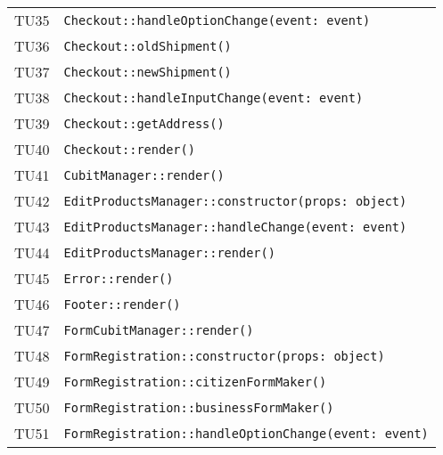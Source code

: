 \begin{longtable}{ >{\centering}p{} >{}p{}}
			\hypertarget{TU35}{TU35} & 
			\texttt{Checkout::handleOptionChange(event: event)}\\
			
			\hypertarget{TU36}{TU36} & 
			\texttt{Checkout::oldShipment()}\\
			
			\hypertarget{TU37}{TU37} & 
			\texttt{Checkout::newShipment()}\\
			
			\hypertarget{TU38}{TU38} & 
			\texttt{Checkout::handleInputChange(event: event)}\\
			
			\hypertarget{TU39}{TU39} & 
			\texttt{Checkout::getAddress()}\\
			
			\hypertarget{TU40}{TU40} & 
			\texttt{Checkout::render()}\\
			
			\hypertarget{TU41}{TU41} & 
			\texttt{CubitManager::render()}\\
			
			\hypertarget{TU42}{TU42} & 
			\texttt{EditProductsManager::constructor(props: object)}\\
			
			\hypertarget{TU43}{TU43} & 
			\texttt{EditProductsManager::handleChange(event: event)}\\
			
			\hypertarget{TU44}{TU44} & 
			\texttt{EditProductsManager::render()}\\
			
			\hypertarget{TU45}{TU45} & 
			\texttt{Error::render()}\\
			
			\hypertarget{TU46}{TU46} & 
			\texttt{Footer::render()}\\
			
			\hypertarget{TU47}{TU47} & 
			\texttt{FormCubitManager::render()}\\
			
			\hypertarget{TU48}{TU48} & 
			\texttt{FormRegistration::constructor(props: object)}\\
			
			\hypertarget{TU49}{TU49} & 
			\texttt{FormRegistration::citizenFormMaker()}\\
			
			\hypertarget{TU50}{TU50} & 
			\texttt{FormRegistration::businessFormMaker()}\\

			\hypertarget{TU51}{TU51} & 
			\texttt{FormRegistration::handleOptionChange(event: event)}\\
			

\end{longtable}
